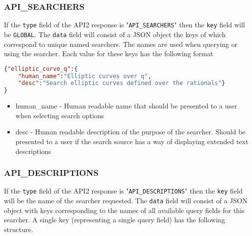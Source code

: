 \documentclass[11pt]{article}
\begin{document}
\subsubsection{API\_SEARCHERS}
If the \texttt{type} field of the API2 response is "\texttt{API\_SEARCHERS}" then the \texttt{key} field will be \texttt{GLOBAL}. The \texttt{data} field will consist of a JSON object the keys of which correspond to unique named searchers. The names are used when querying or using the searcher. Each value for these keys has the following format

\begin{lstlisting}[language=json,firstnumber=1]
{"elliptic_curve_q":{
	"human_name":"Elliptic curves over q",
	"desc":"Search elliptic curves defined over the rationals"}
}
\end{lstlisting}
\begin{itemize}
\item human\_name - Human readable name that should be presented to a user when selecting search options
\item desc - Human readable description of the purpose of the searcher. Should be presented to a user if the search source has a way of displaying extended text descriptions
\end{itemize}

\subsubsection{API\_DESCRIPTIONS}
If the \texttt{type} field of the API2 response is "\texttt{API\_DESCRIPTIONS}" then the \texttt{key} field will be the name of the searcher requested. The \texttt{data} field will consist of a JSON object with keys corresponding to the names of all available query fields for this searcher. A single key (representing a single query field) has the following structure.
\end{document}
